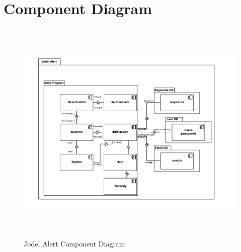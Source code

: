 \documentclass[a4paper,12pt]{article}
\begin{document}
\section{Component Diagram}
\begin{figure}[!h]
	\centering
	\includegraphics[height=11cm]{img/component_diagram.pdf}
	\caption{Jodel Alert Component Diagram}
	\label{Component Diagram}
\end{figure}
\clearpage
\end{document}

